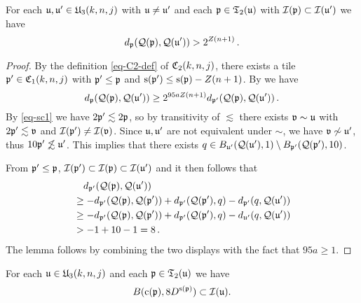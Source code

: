 \begin{lemma}
    \label{forest-separation}
    \leanok
    For each $\fu,\fu'\in \fU_3(k,n,j)$ with $\fu\neq \fu'$ and each $\fp \in \fT_2(\fu)$
    with $\scI(\fp)\subset \scI(\fu')$ we have
    \begin{equation}
    d_{\fp}(\fcc(\fp), \fcc(\fu')) > 2^{Z(n+1)}\,.
    \end{equation}
\end{lemma}

\begin{proof}
    \leanok
    By the definition \eqref{eq-C2-def} of $\fC_2(k,n,j)$, there exists a tile $\fp' \in \fC_1(k,n,j)$ with $\fp' \le \fp$ and $\ps(\fp') \le \ps(\fp)- Z(n+1)$.
    By  we have
    $$
        d_{\fp}(\fcc(\fp), \fcc(\fu')) \ge 2^{95a Z(n+1)} d_{\fp'}(\fcc(\fp), \fcc(\fu'))\,.
    $$
    By \eqref{eq-sc1} we have $2\fp' \lesssim 2\fp$, so by transitivity of $\lesssim$ there exists $\mathfrak{v} \sim \fu$ with $2\fp' \lesssim \mathfrak{v}$ and $\scI(\fp') \ne \scI(\mathfrak{v})$. Since $\fu, \fu'$ are not equivalent under $\sim$, we have $\mathfrak{v} \not \sim \fu'$, thus $10\fp' \not\lesssim \fu'$. This implies that there exists $q \in B_{\fu'}(\fcc(\fu'), 1) \setminus B_{\fp'}(\fcc(\fp'), 10)$.

    From $\fp' \le \fp$, $\scI(\fp') \subset \scI(\fp) \subset \scI(\fu')$ and  it then follows that
    \begin{align*}
        &\quad d_{\fp'}(\fcc(\fp), \fcc(\fu'))\\
        &\ge -d_{\fp'}(\fcc(\fp), \fcc(\fp')) + d_{\fp'}(\fcc(\fp'), q) - d_{\fp'}(q, \fcc(\fu'))\\
        &\ge -d_{\fp'}(\fcc(\fp), \fcc(\fp')) + d_{\fp'}(\fcc(\fp'), q) - d_{\fu'}(q, \fcc(\fu'))\\
        &> -1 + 10 - 1 = 8\,.
    \end{align*}
    The lemma follows by combining the two displays with the fact that $95 a \ge 1$.
\end{proof}

\begin{lemma}
    \label{forest-inner}
    \leanok
    For each $\fu\in \fU_3(k,n,j)$
    and each $\fp \in \mathfrak{T}_2(\fu)$
    we have
    \begin{equation}
        B(\pc(\fp), 8 D^{\ps(\fp)}) \subset \scI(\fu).
    \end{equation}
\end{lemma}

